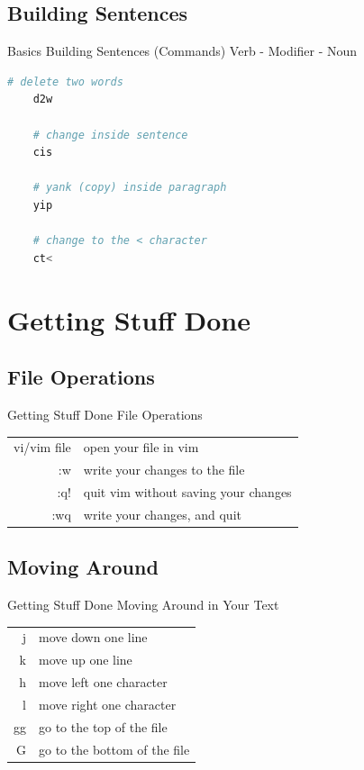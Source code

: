 \documentclass{beamer}
\begin{document}
\subsection{Building Sentences}
\begin{frame}[fragile] {Basics} {Building Sentences (Commands)}
    \centering
    Verb - Modifier - Noun

    \begin{lstlisting}[language=sh]
    # delete two words
    d2w

    # change inside sentence
    cis

    # yank (copy) inside paragraph 
    yip

    # change to the < character
    ct<
    \end{lstlisting}
\end{frame}


\section{Getting Stuff Done}

\subsection{File Operations}
\begin{frame}[c]{Getting Stuff Done} {File Operations}
    \begin{table}[htpb]
        \centering
        \begin{tabular}{r|l}
            vi/vim file & open your file in vim \\
            :w & write your changes to the file \\
            :q! & quit vim without saving your changes \\
            :wq & write your changes, and quit \\
        \end{tabular}
    \end{table}
\end{frame}


\subsection{Moving Around}
\begin{frame}[c]{Getting Stuff Done} {Moving Around in Your Text} 
    \begin{table}[htpb]
        \centering
        \begin{tabular}{r|l}
            j & move down one line \\
            k & move up one line \\
            h & move left one character \\
            l & move right one character \\
            gg & go to the top of the file \\
            G & go to the bottom of the file \\
        \end{tabular}
    \end{table}
\end{frame}
\end{document}
